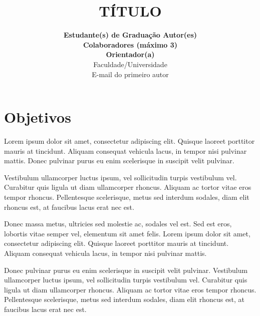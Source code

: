 \documentclass[a4paper,10pt,twocolumn]{article}
\newlength{\titlespace}
\begin{document}

\title{
    \vspace*{-0.8cm}
    {\fontsize{13}{13}\textbf{TÍTULO}}
    \vspace*{-0.1cm}
}
\author{
    \textbf{Estudante(s) de Graduação Autor(es)}
    \vspace*{\titlespace}
    \\
    \textbf{Colaboradores (máximo 3)}
    \vspace*{\titlespace}
    \\
    \textbf{Orientador(a)}
    \vspace*{\titlespace}
    \\
    Faculdade/Universidade
    \vspace*{\titlespace}
    \\
    \normalsize{E-mail do primeiro autor}
}
\date{}
\maketitle

\thispagestyle{fancy}

\section*{Objetivos}

Lorem ipsum dolor sit amet, consectetur adipiscing elit. Quisque laoreet porttitor mauris at tincidunt. Aliquam consequat vehicula lacus, in tempor nisi pulvinar mattis. Donec pulvinar purus eu enim scelerisque in suscipit velit pulvinar.

Vestibulum ullamcorper luctus ipsum, vel sollicitudin turpis vestibulum vel. Curabitur quis ligula ut diam ullamcorper rhoncus. Aliquam ac tortor vitae eros tempor rhoncus. Pellentesque scelerisque, metus sed interdum sodales, diam elit rhoncus est, at faucibus lacus erat nec est.

Donec massa metus, ultricies sed molestie ac, sodales vel est. Sed est eros, lobortis vitae semper vel, elementum sit amet felis. Lorem ipsum dolor sit amet, consectetur adipiscing elit. Quisque laoreet porttitor mauris at tincidunt. Aliquam consequat vehicula lacus, in tempor nisi pulvinar mattis.

Donec pulvinar purus eu enim scelerisque in suscipit velit pulvinar. Vestibulum ullamcorper luctus ipsum, vel sollicitudin turpis vestibulum vel. Curabitur quis ligula ut diam ullamcorper rhoncus. Aliquam ac tortor vitae eros tempor rhoncus. Pellentesque scelerisque, metus sed interdum sodales, diam elit rhoncus est, at faucibus lacus erat nec est.
\end{document}
